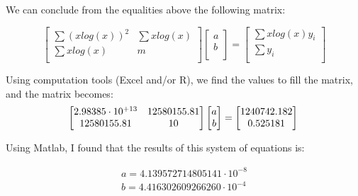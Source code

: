 \documentclass[]{report}
\begin{document}
				
				We can conclude from the equalities above the following matrix:

				\begin{equation}
						\begin{bmatrix}
						\sum (x log(x))^2 & \sum x log(x) \\
						\sum x log(x) & m \\
						\end{bmatrix}
						\begin{bmatrix}
						a \\
						b \\
						\end{bmatrix}
						=
						\begin{bmatrix}
						\sum x log(x) y_i\\
						\sum y_i \\
						\end{bmatrix}
				\end{equation}
				
				Using computation tools (Excel and/or R), we find the values to fill the matrix, and the matrix becomes:
				\\
				\begin{equation}
						\begin{bmatrix}
						2.98385 \cdot 10^{+13} & 12580155.81 \\
						12580155.81 & 10 \\
						\end{bmatrix}
						\begin{bmatrix}
						a \\
						b \\
						\end{bmatrix}
						=
						\begin{bmatrix}
						1240742.182 \\
						0.525181 \\
						\end{bmatrix} \\
				\end{equation}				
		 		
		 		Using Matlab, I found that the results of this system of equations is:
		 		
		 		\begin{equation}
		 			\begin{align}
						a = 4.139572714805141\cdot10^{-8}\\
						b = 4.416302609266260\cdot10^{-4}
		 			\end{align}
				\end{equation}
				
\end{document}
